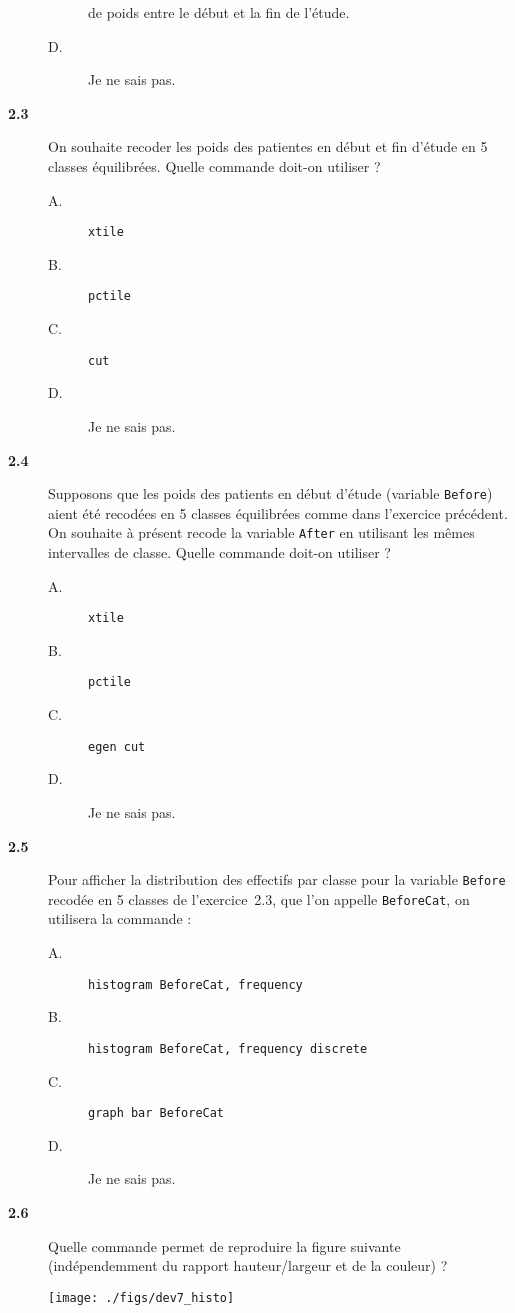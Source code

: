 \begin{description}
\begin{description}
    de poids entre le début et la fin de l'étude.
  \item[D.] Je ne sais pas.
  \end{description}  
\item[\bf 2.3] On souhaite recoder les poids des patientes en début et fin
  d'étude en 5 classes équilibrées. Quelle commande doit-on utiliser ?
  \begin{description}
  \item[A.] \verb|xtile|
  \item[B.] \verb|pctile|
  \item[C.] \verb|cut|
  \item[D.] Je ne sais pas.
  \end{description}  
\item[\bf 2.4] Supposons que les poids des patients en début d'étude
  (variable \texttt{Before}) aient été recodées en 5 classes équilibrées
  comme dans l'exercice précédent. On souhaite à présent recode la variable
  \texttt{After} en utilisant les mêmes intervalles de classe. Quelle
  commande doit-on utiliser ?
  \begin{description}
  \item[A.] \verb|xtile|
  \item[B.] \verb|pctile|
  \item[C.] \verb|egen cut|
  \item[D.] Je ne sais pas.
  \end{description}
\item[\bf 2.5] Pour afficher la distribution des effectifs par classe pour
  la variable \texttt{Before} recodée en 5 classes de l'exercice~2.3, que
  l'on appelle \texttt{BeforeCat}, on utilisera la commande : 
  \begin{description}
  \item[A.] \verb|histogram BeforeCat, frequency|
  \item[B.] \verb|histogram BeforeCat, frequency discrete|
  \item[C.] \verb|graph bar BeforeCat|
  \item[D.] Je ne sais pas.
  \end{description}
\item[\bf 2.6] Quelle commande permet de reproduire la figure suivante
  (indépendemment du rapport hauteur/largeur et de la couleur) ? 
  \begin{center}
    \texttt{[image: ./figs/dev7\_histo]}
  \end{center}

\end{description}

